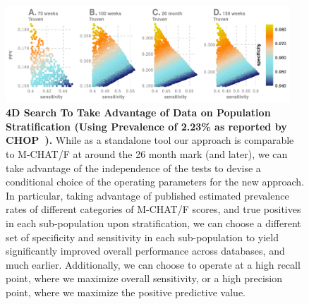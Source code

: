 \documentclass[3p,super,numbers,sort&compress,preprint,10pt]{elsarticle}
\renewcommand{\captionN}[1]{\caption{\color{CadetBlue4!80!black} \sffamily \fontsize{9}{10}\selectfont #1  }}
\newif\iftikzX
\begin{document}
\begin{figure}[t]
  \tikzexternalenable
  \vspace{-10pt}
  
  \centering

   \iftikzX

\else
  \includegraphics[width=0.95\textwidth]{Figures/External/4dopt}
  \fi 

\captionN{\textbf{4D Search To Take Advantage of Data on Population Stratification (Using Prevalence of 2.23\% as reported by CHOP~\cite{pmid31562252}).} While as  a standalone tool our approach is comparable to M-CHAT/F at around the 26 month mark (and later), we can take advantage of the independence of the tests to devise a conditional choice of the operating parameters for the new approach. In particular, taking advantage of published estimated prevalence rates of different categories of  M-CHAT/F scores, and  true positives in each sub-population upon stratification, we can choose a different set of specificity and sensitivity in each sub-population to yield significantly improved overall performance across databases, and much earlier. Additionally, we can choose to operate at a high recall point, where we maximize overall sensitivity, or a high precision point, where we maximize the positive predictive value.} \label{EXT-fig4D}
\end{figure}
\else
{}\label{EXT-fig4D}
\fi
\end{document}
